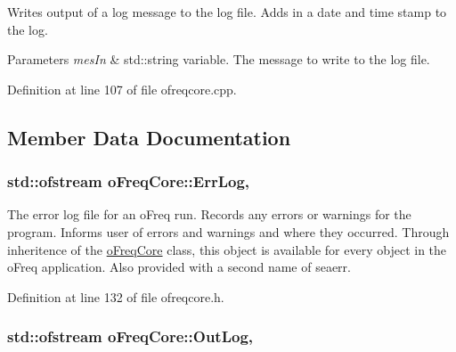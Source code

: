 Writes output of a log message to the log file. Adds in a date and time stamp to the log. 


\begin{DoxyParams}{Parameters}
{\em mes\-In} & std\-::string variable. The message to write to the log file. \\
\hline
\end{DoxyParams}


Definition at line 107 of file ofreqcore.\-cpp.



\subsection{Member Data Documentation}
\hypertarget{classosea_1_1ofreq_1_1o_freq_core_a5e31044ee80fa436289e569c8080b21e}{
\subsubsection[{Err\-Log}]{\setlength{\rightskip}{0pt plus 5cm}std\-::ofstream o\-Freq\-Core\-::\-Err\-Log\hspace{0.3cm}{\ttfamily [static]}, {\ttfamily [protected]}}}\label{classosea_1_1ofreq_1_1o_freq_core_a5e31044ee80fa436289e569c8080b21e}


The error log file for an o\-Freq run. Records any errors or warnings for the program. Informs user of errors and warnings and where they occurred. Through inheritence of the \hyperlink{classosea_1_1ofreq_1_1o_freq_core}{o\-Freq\-Core} class, this object is available for every object in the o\-Freq application. Also provided with a second name of seaerr. 



Definition at line 132 of file ofreqcore.\-h.

\hypertarget{classosea_1_1ofreq_1_1o_freq_core_a85b3e812b6d78c064ba375d5101bb053}{
\subsubsection[{Out\-Log}]{\setlength{\rightskip}{0pt plus 5cm}std\-::ofstream o\-Freq\-Core\-::\-Out\-Log\hspace{0.3cm}{\ttfamily [static]}, {\ttfamily [protected]}}}\label{classosea_1_1ofreq_1_1o_freq_core_a85b3e812b6d78c064ba375d5101bb053}


